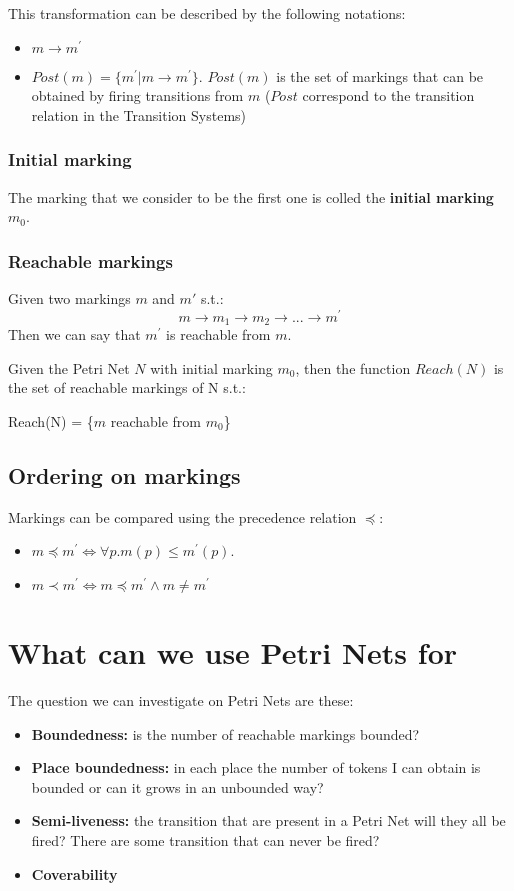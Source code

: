This transformation can be described by the following notations:
\begin{itemize}
    \item $m \rightarrow m^{'}$
    \item $Post(m) = \{m^{'} | m \rightarrow m^{'}\}$. $Post(m)$ is the set of markings that can be obtained by firing transitions from $m$ ($Post$ correspond to the transition relation in the Transition Systems)
\end{itemize}

\subsubsection{Initial marking}
The marking that we consider to be the first one is colled the \textbf{initial marking} $m_{0}$.

\subsubsection{Reachable markings}
Given two markings $m$ and $m{'}$ s.t.:
\begin{equation*}
    m \rightarrow m_{1} \rightarrow m_{2} \rightarrow ... \rightarrow m^{'}
\end{equation*}
Then we can say that $m^{'}$ is reachable from $m$.\par
Given the Petri Net $N$ with initial marking $m_{0}$, then the function $Reach(N)$ is the set of reachable markings of N s.t.:
\begin{center}
    Reach(N) = \{$m$ reachable from $m_{0}$\}
\end{center}

\subsection{Ordering on markings}
Markings can be compared using the precedence relation $\preceq$:
\begin{itemize}
    \item $m \preceq m^{'} \iff \forall p. m(p) \leq m^{'}(p)$.
    \item $m \prec m^{'} \iff m \preceq m^{'} \land m \neq m^{'}$
\end{itemize}

\section{What can we use Petri Nets for}
The question we can investigate on Petri Nets are these:
\begin{itemize}
    \item \textbf{Boundedness:} is the number of reachable markings bounded?
    \item \textbf{Place boundedness:} in each place the number of tokens I can obtain is bounded or can it grows in an unbounded way?
    \item \textbf{Semi-liveness:} the transition that are present in a Petri Net will they all be fired? There are some transition that can never be fired?
    \item \textbf{Coverability}
\end{itemize}

